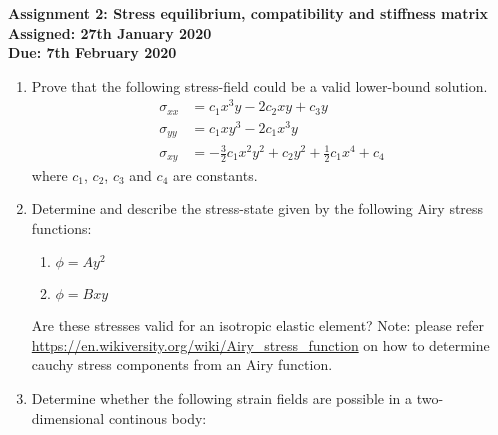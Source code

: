 \documentclass[a4paper,12pt]{article}
\begin{document}
\begin{centering}
	\textbf{
		Assignment 2: Stress equilibrium, compatibility and stiffness matrix\\
		Assigned: 27th January 2020\\
		Due: 7th February 2020\\
	}
\end{centering}

\vspace{1em}
 
\begin{enumerate}
	\item Prove that the following stress-field could be a valid lower-bound solution.
	\begin{align*}
		\sigma_{xx} & = c_1 x^3 y - 2c_2 xy + c_3 y\\
		\sigma_{yy} & = c_1 x y^3 - 2c_1 x^3 y\\
		\sigma_{xy} & = -\frac{3}{2}c_1x^2y^2 + c_2 y^2 + \frac{1}{2}c_1 x^4 + c_4
	\end{align*}
	where $c_1$, $c_2$, $c_3$ and $c_4$ are constants.

	\item Determine and describe the stress-state given by the following Airy stress functions:
	\begin{enumerate}
		\item $\phi = Ay^2$ 
		\item $\phi = Bxy$
	\end{enumerate}
	Are these stresses valid for an isotropic elastic element? Note: please refer \url{https://en.wikiversity.org/wiki/Airy_stress_function} on how to determine cauchy stress components from an Airy function.

	\item Determine whether the following strain fields are possible in a two-dimensional continous body:
	

\end{enumerate}
\end{document}
